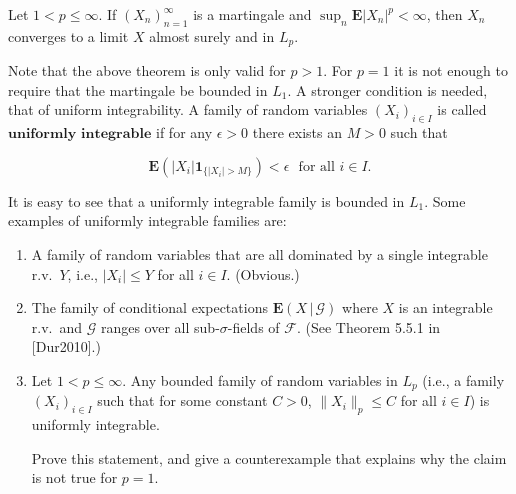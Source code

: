 \begin{thm}
Let $1<p\le \infty$. If $(X_n)_{n=1}^\infty$ is a
martingale and $\sup_n \mathbf{E} |X_n|^p<\infty$,
then $X_n$ converges to a limit $X$ almost surely and
in $L_p$.
\end{thm}

\noindent Note that the above theorem is only valid for $p>1$.
For $p=1$ it is not enough to require that the
martingale be bounded in $L_1$. A stronger condition
is needed, that of uniform integrability. A family of
random variables $(X_i)_{i\in I}$ is called
$\textbf{uniformly integrable}$ if for any
$\epsilon>0$ there exists an $M>0$ such that

\[
\mathbf{E}( |X_i| \mathbf{1}_{\{|X_i|>M\}} ) < \epsilon \ \ \ \textrm{for all }i\in I.
\]

\noindent It is easy to see that a uniformly integrable family
is bounded in $L_1$. Some examples of uniformly
integrable families are:

\begin{enumerate}[label=\arabic*.]
\item A family of random variables that are all dominated
by a single integrable r.v.\ $Y$, i.e., $|X_i|\le Y$
for all $i\in I$. (Obvious.)

\item The family of conditional expectations
$\mathbf{E}\left(X\,|\,\mathcal{G}\right)$ where $X$
is an integrable r.v.\ and $\mathcal{G}$ ranges over
all sub-$\sigma$-fields of $\mathcal{F}$. (See
Theorem 5.5.1 in [Dur2010].)

\item Let $1< p\le \infty$. Any bounded family of random
variables in $L_p$ (i.e., a family $(X_i)_{i\in I}$
such that for some constant $C>0$,
$\lVert X_i \rVert_p\le C$ for all $i\in I$) is
uniformly integrable.

\begin{xexercise}
Prove this statement, and give a counterexample that
explains why the claim is not true for $p=1$.
\end{xexercise}
\end{enumerate}

